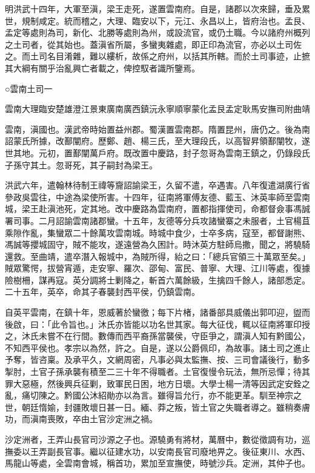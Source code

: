 
\begin{pinyinscope}
明洪武十四年，大軍至滇，梁王走死，遂置雲南府。自是，諸郡以次來歸，垂及累世，規制咸定。統而稽之，大理、臨安以下，元江、永昌以上，皆府治也。孟艮、孟定等處則為司，新化、北勝等處則為州，或設流官，或仍土職。今以諸府州概列之土司者，從其始也。蓋滇省所屬，多蠻夷雜處，即正印為流官，亦必以土司佐之。而土司名目淆雜，難以縷析，故係之府州，以括其所轄。而於土司事迹，止摭其大綱有關乎治亂興亡者載之，俾控馭者識所鑒焉。

○雲南土司一

雲南大理臨安楚雄澄江景東廣南廣西鎮沅永寧順寧蒙化孟艮孟定耿馬安撫司附曲靖

雲南，滇國也。漢武帝時始置益州郡。蜀漢置雲南郡。隋置昆州，唐仍之。後為南詔蒙氏所據，改鄯闡府。歷鄭、趙、楊三氏，至大理段氏，以高智昇領鄯闡牧，遂世其地。元初，置鄯闡萬戶府。既改置中慶路，封子忽哥為雲南王鎮之，仍錄段氏子孫守其土。忽哥死，其子嗣封為梁王。

洪武六年，遣翰林待制王禕等齎詔諭梁王，久留不遣，卒遇害。八年復遣湖廣行省參政吳雲往，中途為梁使所害。十四年，征南將軍傅友德、藍玉、沐英率師至雲南城，梁王赴滇池死，定其地。改中慶路為雲南府，置都指揮使司，命都督僉事馮誠署司事。二月詔諭雲南諸郡蠻。十五年，友德等分兵攻諸蠻寨之未服者，土官楊苴乘隙作亂，集蠻眾二十餘萬攻雲南城。時城中食少，士卒多病，寇至，都督謝熊、馮誠等攖城固守，賊不能攻，遂遠營為久困計。時沐英方駐師烏撒，聞之，將驍騎還救。至曲靖，遣卒潛入報城中，為賊所得，紿之曰：「總兵官領三十萬眾至矣。」賊眾驚愕，拔營宵遁，走安寧、羅次、邵甸、富民、普寧、大理、江川等處，復據險樹柵，謀再寇。英分調將士剿降之，斬首六萬餘級，生擒四千餘人，諸部悉定。二十五年，英卒，命其子春襲封西平侯，仍鎮雲南。

自英平雲南，在鎮十年，恩威著於蠻徼；每下片楮，諸番部具威儀出郭叩迎，盥而後啟，曰：「此令旨也。」沐氏亦皆能以功名世其家。每大征伐，輒以征南將軍印授之，沐氏未嘗不在行間。數傳而西平裔孫當襲侯，守臣爭之，謂滇人知有黔國公，不知西平侯也。孝宗以為然，許之。自是，遂以公爵佩印，為故事。諸土司之進止予奪，皆咨稟。及承平久，文網周密，凡事必與太監撫、按、三司會議後行，動多掣肘，土官子孫承襲有積至二三十年不得職者。土官復慢令玩法，無所忌憚；待其罪大惡極，然後興兵征剿，致軍民日困，地方日壞。大學士楊一清等因武定安銓之亂，痛切陳之。黔國公沐紹勛亦以為言。雖得旨允行，亦不能更革。馴至神宗之世，朝廷惰媮，封疆敗壞日甚一日。緬、莽之叛，皆土官之失職者導之。雖稍奏膚功，而滇南喪敗，卒由土官沙定洲之禍。

沙定洲者，王弄山長官司沙源之子也。源驍勇有將材，萬曆中，數從徵調有功，巡撫委以王弄副長官事。繼以征建水功，以安南長官司廢地畀之。後征東川、水西、馬龍山等處，全雲南會城，稱首功，累加至宣撫使，時號沙兵。定洲，其仲子也。


\end{pinyinscope}

